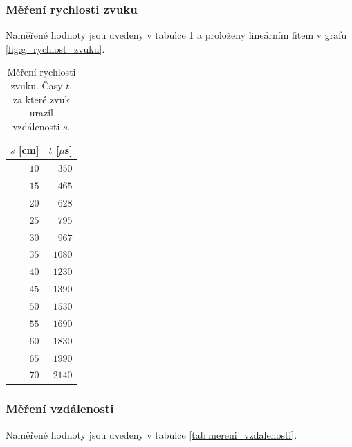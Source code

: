 \documentclass[english]{article}
\begin{document}
	\subsubsection{Měření rychlosti zvuku}
		Naměřené hodnoty jsou uvedeny v tabulce \ref{tab:rychlost_zvuku} a proloženy lineárním fitem v grafu \ref{fig:g_rychlost_zvuku}.
		
	\begin{table}[h]
	\begin{center}
	\begin{tabular}{|r|r|}
	\hline
         $s$ [cm] & $t$ [$\mu$s] \\\hline \hline
         $10$ & $350$ \\\hline
         $15$ & $465$ \\\hline
         $20$ & $628$ \\\hline
         $25$ & $795$ \\\hline
         $30$ & $967$ \\\hline
         $35$ & $1080$ \\\hline
         $40$ & $1230$ \\\hline
         $45$ & $1390$ \\\hline
         $50$ & $1530$ \\\hline
         $55$ & $1690$ \\\hline
         $60$ & $1830$ \\\hline
         $65$ & $1990$ \\\hline
         $70$ & $2140$ \\\hline
	
	\end{tabular}
	\caption{Měření rychlosti zvuku. Časy $t$, za které zvuk urazil vzdálenosti $s$.}
	\label{tab:rychlost_zvuku}
	\end{center}
	\end{table}
	
	\subsubsection{Měření vzdálenosti}
		Naměřené hodnoty jsou uvedeny v tabulce \ref{tab:mereni_vzdalenosti}.
		
\end{document}
